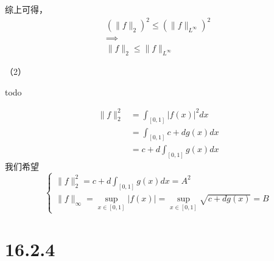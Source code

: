 \documentclass{article}
\begin{document}
综上可得，
\begin{align*}
  (\|f\|_2)^2 \leq (\|f\|_{L^\infty})^2 \\
  \implies                              \\
  \|f\|_2 \leq  \|f\|_{L^\infty}
\end{align*}

（2）

todo

\begin{align*}
  \|f\|_2^2 & = \int_{[0, 1]} |f(x)|^2dx   \\
            & = \int_{[0, 1]} c + dg(x) dx \\
            & = c + d \int_{[0, 1]} g(x)dx
\end{align*}
我们希望
\begin{equation*}
  \begin{cases*}
    \|f\|_2^2 = c + d \int_{[0, 1]} g(x)dx = A^2 \\
    \|f\|_\infty = \sup\limits_{x \in [0, 1]} |f(x)|
    = \sup\limits_{x \in [0, 1]} \sqrt{c + dg(x)}  = B
  \end{cases*}
\end{equation*}

\section*{16.2.4}
\end{document}
